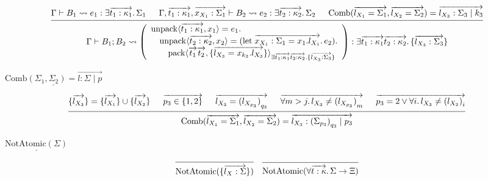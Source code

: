 \documentclass[lualatex,12pt,unicode]{article}
\begin{document}
\[
    \begin{prooftree}
        \hypo{\Gamma \vdash B_1 \rightsquigarrow e_1: \exists \overrightarrow{t_1: \kappa_1}\ldotp \Sigma_1}
        \hypo{\Gamma, \overrightarrow{t_1: \kappa_1}, \overrightarrow{x_{X_1}: \Sigma_1} \vdash B_2 \rightsquigarrow e_2: \exists \overrightarrow{t_2: \kappa_2}\ldotp \Sigma_2}
        \hypo{\mathrm{Comb}(\overrightarrow{l_{X_1} = \Sigma_1}, \overrightarrow{l_{X_2} = \Sigma_2}) = \overrightarrow{l_{X_3}: \Sigma_3 \mid k_3}}
        \infer3{
            \Gamma \vdash B_1; B_2 \rightsquigarrow
            \left(\begin{array}{l}
                \mathrm{unpack}\langle \overrightarrow{t_1: \kappa_1}, x_1\rangle = e_1\ldotp \\
                \hspace{1em}\mathrm{unpack}\langle \overrightarrow{t_2: \kappa_2}, x_2\rangle = (\mathrm{let}\; \overrightarrow{x_{X_1}: \Sigma_1 = x_1.l_{X_1}}\ldotp e_2)\ldotp \\
                \hspace{2em}\mathrm{pack}\langle
                    \overrightarrow{t_1} \overrightarrow{t_2},
                    \{\overrightarrow{l_{X_3} = x_{k_3}.l_{X_3}}\}
                \rangle_{\exists \overrightarrow{t_1: \kappa_1} \overrightarrow{t_2: \kappa_2}\ldotp \{\overrightarrow{l_{X_3}: \Sigma_3}\}}
            \end{array}\right): \exists \overrightarrow{t_1: \kappa_1} \overrightarrow{t_2: \kappa_2}\ldotp \{\overrightarrow{l_{X_3}: \Sigma_3}\}
        }
    \end{prooftree}
\]

$\underline{\mathrm{Comb}(\Sigma_1, \Sigma_2) = \overrightarrow{l: \Sigma \mid p}}$

\[
    \begin{prooftree}
        \hypo{\{\overrightarrow{l_{X_3}}\} = \{\overrightarrow{l_{X_1}}\} \cup \{\overrightarrow{l_{X_2}}\}}
        \hypo{\overrightarrow{p_3 \in \{1,2\}}}
        \hypo{\overrightarrow{l_{X_3} = {(l_{X_{p_3}})}_{q_3}}}
        \hypo{\overrightarrow{\forall m > j\ldotp l_{X_3} \neq {(l_{X_{p_3}})}_m}}
        \hypo{\overrightarrow{p_3 = 2 \lor \forall i\ldotp l_{X_3} \neq {(l_{X_2})}_i}}
        \infer5{\mathrm{Comb}(\overrightarrow{l_{X_1} = \Sigma_1}, \overrightarrow{l_{X_2} = \Sigma_2}) =  \overrightarrow{l_{X_3}: {(\Sigma_{p_3})}_{q_3} \mid p_3}}
    \end{prooftree}
\]

$\underline{\mathrm{NotAtomic}(\Sigma)}$

\[
    \begin{prooftree}
        \infer0{\mathrm{NotAtomic}(\{\overrightarrow{l_X: \Sigma}\})}
    \end{prooftree}
    \hspace{1em}
    \begin{prooftree}
        \infer0{\mathrm{NotAtomic}(\forall \overrightarrow{t: \kappa}\ldotp \Sigma \to \Xi)}
    \end{prooftree}
\]
\end{document}
